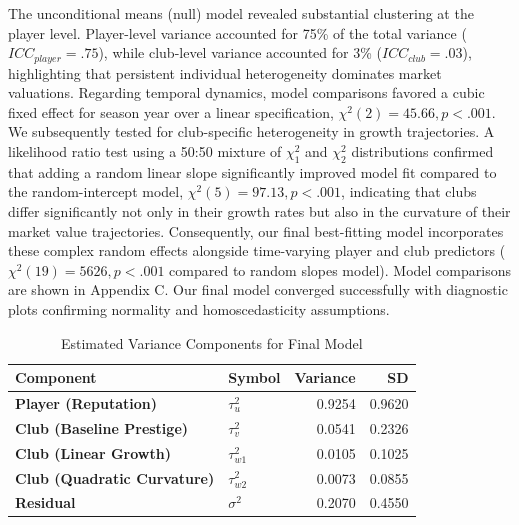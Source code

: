 \documentclass[
  12pt,
]{article}
\begin{document}
The unconditional means (null) model revealed substantial clustering at
the player level. Player-level variance accounted for 75\% of the total
variance (\(ICC_{player}=.75\)), while club-level variance accounted for
3\% (\(ICC_{club}=.03\)), highlighting that persistent individual
heterogeneity dominates market valuations. Regarding temporal dynamics,
model comparisons favored a cubic fixed effect for season year over a
linear specification, \(\chi^2(2)=45.66, p<.001\). We subsequently
tested for club-specific heterogeneity in growth trajectories. A
likelihood ratio test using a 50:50 mixture of \(\chi^2_1\) and
\(\chi^2_2\) distributions confirmed that adding a random linear slope
significantly improved model fit compared to the random-intercept model,
\(\chi^2(5)=97.13, p<.001\), indicating that clubs differ significantly
not only in their growth rates but also in the curvature of their market
value trajectories. Consequently, our final best-fitting model
incorporates these complex random effects alongside time-varying player
and club predictors (\(\chi^2(19)=5626, p<.001\) compared to random
slopes model). Model comparisons are shown in Appendix C. Our final
model converged successfully with diagnostic plots confirming normality
and homoscedasticity assumptions.

\begin{table}[H]
\centering
\caption{\label{tab:unnamed-chunk-3}Estimated Variance Components for Final Model}
\centering
\fontsize{11}{13}\selectfont
\begin{tabular}[t]{>{}llrr}
\toprule
Component & Symbol & Variance & SD\\
\midrule
\textbf{Player (Reputation)} & $\tau^2_u$ & 0.9254 & 0.9620\\
\textbf{Club (Baseline Prestige)} & $\tau^2_v$ & 0.0541 & 0.2326\\
\textbf{Club (Linear Growth)} & $\tau^2_{w1}$ & 0.0105 & 0.1025\\
\textbf{Club (Quadratic Curvature)} & $\tau^2_{w2}$ & 0.0073 & 0.0855\\
\textbf{Residual} & $\sigma^2$ & 0.2070 & 0.4550\\
\bottomrule
\end{tabular}
\end{table}
\end{document}
